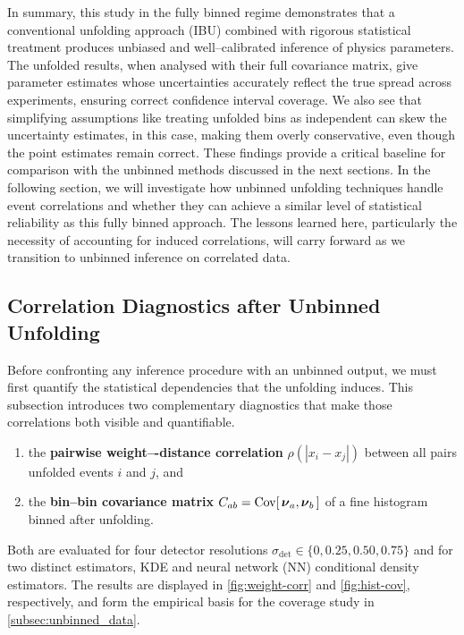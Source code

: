         In summary, this study in the fully binned regime demonstrates that a conventional unfolding approach (IBU) combined with rigorous statistical treatment produces unbiased and well--calibrated inference of physics parameters.
        The unfolded results, when analysed with their full covariance matrix, give parameter estimates whose uncertainties accurately reflect the true spread across experiments, ensuring correct confidence interval coverage.
        We also see that simplifying assumptions like treating unfolded bins as independent can skew the uncertainty estimates, in this case, making them overly conservative, even though the point estimates remain correct.
        These findings provide a critical baseline for comparison with the unbinned methods discussed in the next sections.
        In the following section, we will investigate how unbinned unfolding techniques handle event correlations and whether they can achieve a similar level of statistical reliability as this fully binned approach. The lessons learned here, particularly the necessity of accounting for induced correlations, will carry forward as we transition to unbinned inference on correlated data.
    \subsection{Correlation Diagnostics after Unbinned Unfolding}
    \label{subsec:weight_correlations}
        Before confronting any inference procedure with an unbinned output, we must first quantify the statistical dependencies that the unfolding induces.
        This subsection introduces two complementary diagnostics that make those correlations both {visible} and {quantifiable}.
        \begin{enumerate}
            \item the \textbf{pairwise weight–-distance correlation} $\rho(|x_i-x_j|)$ between all pairs unfolded events $i$ and $j$, and
            \item the \textbf{bin--bin covariance matrix} $C_{ab} = \operatorname{Cov}[\,\vb*{\nu}_a,\vb*{\nu}_b\,]$ of a fine histogram binned {after} unfolding.
        \end{enumerate}
        Both are evaluated for four detector resolutions $\sigma_{\det}\in\{0,0.25,0.50,0.75\}$ and for two distinct estimators, {KDE} and neural network (\textsc{NN}) conditional density estimators.
        The results are displayed in \cref{fig:weight-corr} and \cref{fig:hist-cov}, respectively, and form the empirical basis for the coverage study in \cref{subsec:unbinned_data}.
